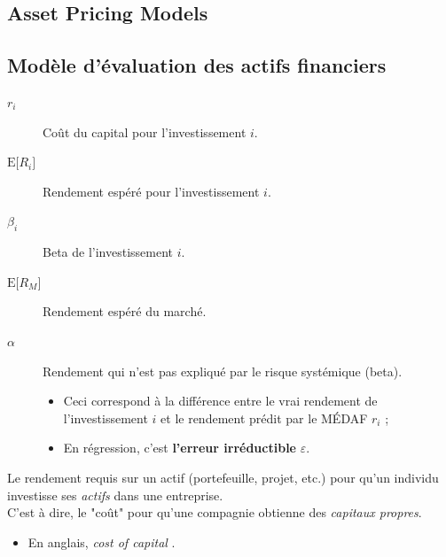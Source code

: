 \documentclass[10pt, french]{article}
\begin{document}
\begin{multicols*}{2}
\newpage
\section{Asset Pricing Models}
\subsection{Modèle d'évaluation des actifs financiers}
\begin{distributions}[Notation]
\begin{description}
	\item[$r_{i}$]	Coût du capital pour l'investissement $i$.
	\item[$\text{E}\lbrack R_{i} \rbrack$]	Rendement espéré pour l'investissement $i$.
	\item[$\beta_{i}$]	Beta de l'investissement $i$.
	\item[$\text{E}\lbrack R_{M} \rbrack$]	Rendement espéré du marché.
	\item[$\alpha$]	Rendement qui n'est pas expliqué par le risque systémique (beta).
		\begin{itemize}
		\item	Ceci correspond à la différence entre le vrai rendement de l'investissement $i$ et le rendement prédit par le MÉDAF $r_{i}$ ;
		\item	En régression, c'est \textbf{l'erreur irréductible} $\varepsilon$.
		\end{itemize}
\end{description}
\end{distributions}

\begin{definitionNOHFILLsub}
Le rendement requis sur un actif (portefeuille, projet, etc.) pour qu'un individu investisse ses \textit{actifs} dans une entreprise.	\\
 C'est à dire, le "coût" pour qu'une compagnie obtienne des \textit{capitaux propres}.

\begin{itemize}
	\item	En anglais, \og \textit{cost of capital} \fg{}.
\end{itemize}

\end{definitionNOHFILLsub}


\end{multicols*}
\end{document}
